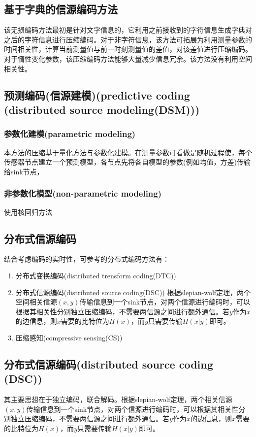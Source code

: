 \subsection{基于字典的信源编码方法}
该无损编码方法最初是针对文字信息的，它利用之前接收到的字符信息生成字典对之后的字符信息进行压缩编码。对于非字符信息，该方法可拓展为利用测量参数的时间相关性，计算当前测量值与前一时刻测量值的差值，对该差值进行压缩编码。\textcolor[rgb]{1,0,0}{对于惰性变化参数，该压缩编码方法能够大量减少信息冗余}。\textcolor[rgb]{0,0,1}{该方法没有利用空间相关性}。

\subsection{预测编码(信源建模)(predictive coding (distributed source modeling(DSM)))}
\subsubsection{参数化建模(parametric modeling)}
本方法的压缩基于量化方法与参数化建模。在测量参数可看做是随机过程使，每个传感器节点建立一个预测模型，各节点先将各自模型的参数(例如均值，方差)传输给sink节点，
\subsubsection{非参数化模型(non-parametric modeling)}
使用核回归方法


\subsection{分布式信源编码}
结合考虑编码的实时性，可参考的分布式编码方法有：
\begin{enumerate}
    \item 分布式变换编码(distributed trensform coding(DTC))
    \item 分布式信源编码(distributed source coding(DSC)) 根据slepian-wolf定理，两个空间相关信源$(x,y)$传输信息到一个sink节点，对两个信源进行编码时，可以根据其相关性分别独立压缩编码，不需要两信源之间进行额外通信。若$y$作为$x$的边信息，则$x$需要的比特位为$H(x)$，而$y$只需要传输$H(x|y)$即可。
    \item 压缩感知(compressive sensing(CS)) 
\end{enumerate}

\subsection{分布式信源编码(distributed source coding (DSC))}
其主要思想在于独立编码，联合解码。根据slepian-wolf定理，两个相关信源$(x,y)$传输信息到一个sink节点，对两个信源进行编码时，可以根据其相关性分别独立压缩编码，不需要两信源之间进行额外通信。若$y$作为$x$的边信息，则$x$需要的比特位为$H(x)$，而$y$只需要传输$H(x|y)$即可。


